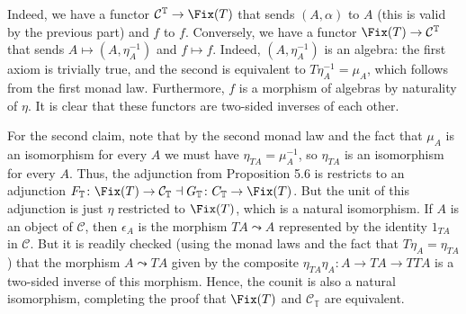 Indeed, we have a functor $\mathcal{C}^{\mathbb{T}}\to \Fix(T)$ that sends
$(A, \alpha)$ to $A$ (this is valid by the previous part) and
$f$ to $f$. Conversely, we have a functor $\Fix(T) \to \mathcal{C}^{\mathbb{T}}$
that sends $A\mapsto (A, \eta_A^{-1})$ and $f\mapsto f$. Indeed, $(A, \eta_A^{-1})$
is an algebra: the first axiom is trivially true, and the second is equivalent
to $T\eta_A^{-1} = \mu_A$, which follows from the first monad law. Furthermore,
$f$ is a morphism of algebras by naturality of $\eta$. It is clear that these
functors are two-sided inverses of each other.

For the second claim, note that by the second monad law and the fact that $\mu_A$
is an isomorphism for every $A$ we must have $\eta_{TA} = \mu_A^{-1}$, so
$\eta_{TA}$ is an isomorphism for every $A$. Thus, the adjunction from Proposition
5.6 is restricts to an adjunction
$F_{\mathbb{T}}\colon \Fix(T)\to \mathcal{C}_{\mathbb{T}}\dashv G_{\mathbb{T}}\colon C_{\mathbb{T}}\to \Fix(T)$.
But the unit of this adjunction is just $\eta$ restricted to $\Fix(T)$, which is
a natural isomorphism. If $A$ is an object of $\mathcal{C}$, then $\epsilon_A$
is the morphism $TA\leadsto A$ represented by the identity $1_{TA}$ in $\mathcal{C}$.
But it is readily checked (using the monad laws and the fact that $T\eta_A = \eta_{TA}$)
that the morphism $A \leadsto TA$ given by the composite
$\eta_{TA}\eta_A\colon A\to TA\to TTA$ is a two-sided inverse of this morphism.
Hence, the counit is also a natural isomorphism, completing the proof that
$\Fix(T)$ and $\mathcal{C}_{\mathbb{T}}$ are equivalent.
